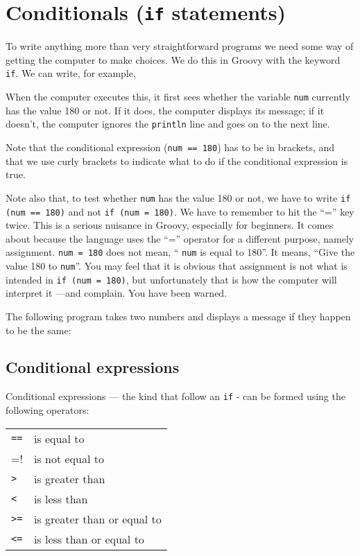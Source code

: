 \section{Conditionals (\texttt{if} statements)}

To write anything more than very straightforward programs we need some way
of getting the computer to make choices.
We do this in Groovy with the keyword \verb!if!.
We can write, for example,


When the computer executes this, it first sees whether the variable \verb!num!
currently has the value 180 or not.  If it does, the computer displays
its message; if it doesn't, the computer ignores the  \verb!println! line
and goes on to the next line.

Note that the conditional expression (\verb!num == 180!) has to be
in brackets, and that we use curly brackets to indicate what to do if
the conditional expression is true. 

Note also that, to test whether  \verb!num! has the value 180
or not, we have to write \verb!if (num == 180)! and not \verb!if (num = 180)!.
We have to remember to hit the ``='' key twice.
This is a serious nuisance in Groovy, especially for beginners.
It comes about because the language uses the ``='' operator for a different
purpose, namely assignment.  \verb!num = 180! does not mean, `` \verb!num! is
equal to 180''.  It means, ``Give the value 180 to  \verb!num!''.  You may feel
that it is obvious that assignment is not what is intended in
\verb!if (num = 180)!, but unfortunately that is
how the computer will interpret it ---and complain.
You have been warned.

The following program takes two numbers and displays a message if they happen
to be the same:


\subsection{Conditional expressions}
\label{sec:cond-expr}

Conditional expressions --- the kind that follow an \verb!if! -
can be formed using the following operators:

\begin{tabular}{ll}
\verb!==! &is equal to\\
\verb!!=! &is not equal to\\
\verb!>! &is greater than\\
\verb!<! &is less than\\
\verb!>=! & is greater than or equal to\\
\verb!<=! &is less than or equal to\\
\end{tabular}

